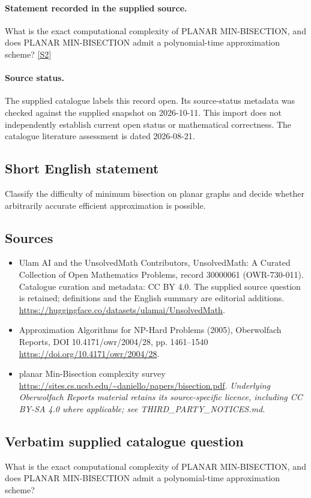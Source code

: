 \documentclass[11pt]{article}
\begin{document}
\paragraph{Statement recorded in the supplied source.}
What is the exact computational complexity of PLANAR MIN-BISECTION, and does PLANAR MIN-BISECTION admit a polynomial-time approximation scheme? \href{https://doi.org/10.4171/owr/2004/28}{[S2]}
\paragraph{Source status.}
The supplied catalogue labels this record open. Its source-status metadata was checked against the supplied snapshot on 2026-10-11. This import does not independently establish current open status or mathematical correctness. The catalogue literature assessment is dated 2026-08-21.
\subsection{Short English statement}
Classify the difficulty of minimum bisection on planar graphs and decide whether arbitrarily accurate efficient approximation is possible.
\subsection{Sources}
\begin{itemize}
\item[S1] Ulam AI and the UnsolvedMath Contributors, UnsolvedMath: A Curated Collection of Open Mathematics Problems, record 30000061 (OWR-730-011). Catalogue curation and metadata: CC BY 4.0. The supplied source question is retained; definitions and the English summary are editorial additions.
\url{https://huggingface.co/datasets/ulamai/UnsolvedMath}.
\item[S2] Approximation Algorithms for NP-Hard Problems (2005), Oberwolfach Reports, DOI 10.4171/owr/2004/28, pp. 1461--1540
\url{https://doi.org/10.4171/owr/2004/28}.
\item[S3] planar Min-Bisection complexity survey
\url{https://sites.cs.ucsb.edu/~daniello/papers/bisection.pdf}.
\textit{Underlying Oberwolfach Reports material retains its source-specific licence, including CC BY-SA 4.0 where applicable; see THIRD\_PARTY\_NOTICES.md.}
\end{itemize}
\subsection{Verbatim supplied catalogue question}
What is the exact computational complexity of PLANAR MIN-BISECTION, and does PLANAR MIN-BISECTION admit a polynomial-time approximation scheme?
\end{document}
